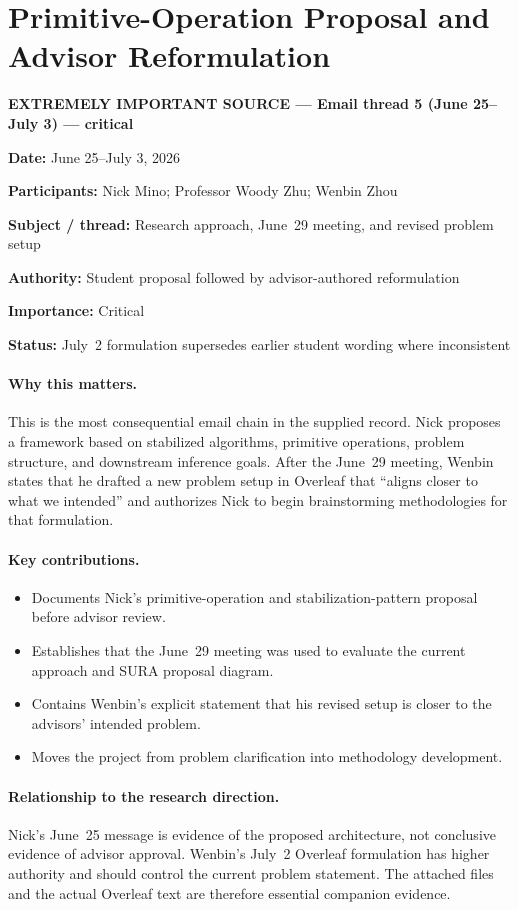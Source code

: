 \documentclass[11pt]{article}
\newcommand{\CriticalSource}[1]{%
  \par\noindent\textcolor{critical}{\textbf{EXTREMELY IMPORTANT SOURCE --- #1}}%
  \par\medskip
}
\newcommand{\Meta}[2]{%
  \par\noindent\textbf{#1:} #2\par\nobreak
}
\begin{document}
\clearpage
\section{Primitive-Operation Proposal and Advisor Reformulation}
\CriticalSource{Email thread 5 (June 25--July 3) --- critical}

\Meta{Date}{June 25--July 3, 2026}
\Meta{Participants}{Nick Mino; Professor Woody Zhu; Wenbin Zhou}
\Meta{Subject / thread}{Research approach, June~29 meeting, and revised problem
setup}
\Meta{Authority}{Student proposal followed by advisor-authored reformulation}
\Meta{Importance}{Critical}
\Meta{Status}{July~2 formulation supersedes earlier student wording where
inconsistent}

\paragraph{Why this matters.}
This is the most consequential email chain in the supplied record. Nick
proposes a framework based on stabilized algorithms, primitive operations,
problem structure, and downstream inference goals. After the June~29 meeting,
Wenbin states that he drafted a new problem setup in Overleaf that ``aligns
closer to what we intended'' and authorizes Nick to begin brainstorming
methodologies for that formulation.

\paragraph{Key contributions.}
\begin{itemize}[leftmargin=*,itemsep=0.25em]
  \item Documents Nick's primitive-operation and stabilization-pattern proposal
        before advisor review.
  \item Establishes that the June~29 meeting was used to evaluate the current
        approach and SURA proposal diagram.
  \item Contains Wenbin's explicit statement that his revised setup is closer
        to the advisors' intended problem.
  \item Moves the project from problem clarification into methodology
        development.
\end{itemize}

\paragraph{Relationship to the research direction.}
Nick's June~25 message is evidence of the proposed architecture, not conclusive
evidence of advisor approval. Wenbin's July~2 Overleaf formulation has higher
authority and should control the current problem statement. The attached files
and the actual Overleaf text are therefore essential companion evidence.
\end{document}
